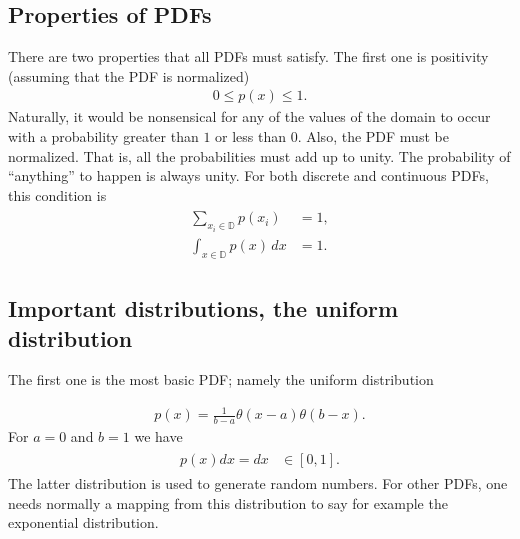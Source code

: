 \documentclass[letterpaper,10pt,english]{sphinxmanual}
\begin{document}
\subsection{Properties of PDFs}
\label{\detokenize{chapter2:properties-of-pdfs}}
There are two properties that all PDFs must satisfy. The first one is
positivity (assuming that the PDF is normalized)
\begin{equation*}
\begin{split}
0 \leq p(x) \leq 1.
\end{split}
\end{equation*}
Naturally, it would be nonsensical for any of the values of the domain
to occur with a probability greater than \(1\) or less than \(0\). Also,
the PDF must be normalized. That is, all the probabilities must add up
to unity.  The probability of “anything” to happen is always unity. For
both discrete and continuous PDFs, this condition is
\begin{equation*}
\begin{split}
\begin{align*}
\sum_{x_i\in\mathbb D} p(x_i) & =  1,\\
\int_{x\in\mathbb D} p(x)\,dx & =  1.
\end{align*}
\end{split}
\end{equation*}

\subsection{Important distributions, the uniform distribution}
\label{\detokenize{chapter2:important-distributions-the-uniform-distribution}}
The first one
is the most basic PDF; namely the uniform distribution




\begin{equation*}
\begin{split}
\begin{equation}
p(x) = \frac{1}{b-a}\theta(x-a)\theta(b-x).
\label{eq:unifromPDF} \tag{1}
\end{equation}
\end{split}
\end{equation*}
For \(a=0\) and \(b=1\) we have
\begin{equation*}
\begin{split}
\begin{array}{ll}
p(x)dx = dx & \in [0,1].
\end{array}
\end{split}
\end{equation*}
The latter distribution is used to generate random numbers. For other PDFs, one needs normally a mapping from this distribution to say for example the exponential distribution.
\end{document}
